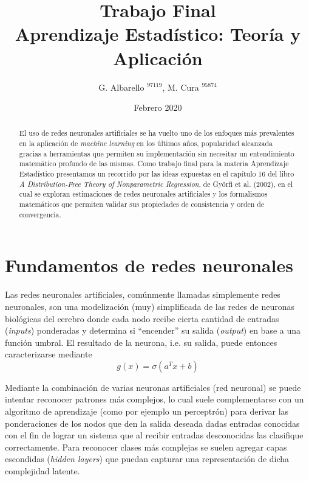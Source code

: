 \documentclass[12pt]{extarticle}
\title{Trabajo Final \\ Aprendizaje Estadístico: Teoría y Aplicación}
\author{G. Albarello ${}^{97119}$,
M. Cura ${}^{95874}$}
\date{Febrero 2020}
\begin{document}
\maketitle


\begin{abstract}
    El uso de redes neuronales artificiales se ha vuelto uno de los enfoques más prevalentes en la aplicación de \textit{machine learning} en los últimos años, popularidad alcanzada gracias a herramientas que permiten su implementación sin necesitar un entendimiento matemático profundo de las mismas. Como trabajo final para la materia Aprendizaje Estadístico presentamos un recorrido por las ideas expuestas en el capítulo 16 del libro \textit{A Distribution-Free Theory of Nonparametric Regression}, de Györfi et al. (2002), en el cual se exploran estimaciones de redes neuronales artificiales y los formalismos matemáticos que permiten validar sus propiedades de consistencia y orden de convergencia.
\end{abstract}


\newpage
\section{Fundamentos de redes neuronales}

    Las redes neuronales artificiales, comúnmente llamadas simplemente redes neuronales, son una modelización (muy) simplificada de las redes de neuronas biológicas del cerebro donde cada nodo recibe cierta cantidad de entradas (\textit{inputs}) ponderadas y determina si ``encender'' su salida (\textit{output}) en base a una función umbral. El resultado de la neurona, i.e. su salida, puede entonces caracterizarse mediante
    \begin{equation*}    
        g(x) = \sigma\left(a^T x + b\right)
    \end{equation*}

    Mediante la combinación de varias neuronas artificiales (red neuronal) se puede intentar reconocer patrones más complejos, lo cual suele complementarse con un algoritmo de aprendizaje (como por ejemplo un perceptrón) para derivar las ponderaciones de los nodos que den la salida deseada dadas entradas conocidas con el fin de lograr un sistema que al recibir entradas desconocidas las clasifique correctamente. Para reconocer clases más complejas se suelen agregar capas escondidas (\textit{hidden layers}) que puedan capturar una representación de dicha complejidad latente.
    
\end{document}
